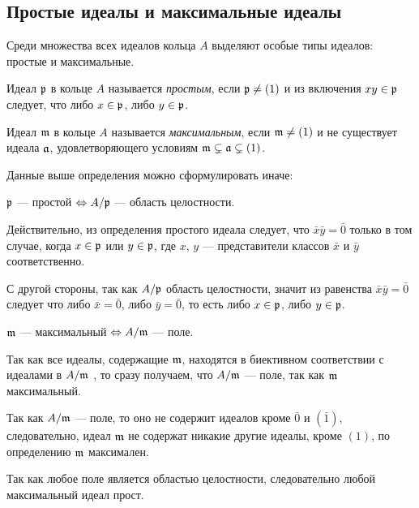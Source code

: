     \subsection{Простые идеалы и максимальные идеалы}
    Среди множества всех идеалов кольца $A$ выделяют особые типы идеалов: простые и максимальные.
    \begin{Def}
        Идеал $\mathfrak{p}$ в кольце $A$ называется \textit{простым}, если $\mathfrak{p} \neq (1)$ и из включения $xy \in \mathfrak{p}$ следует, что либо $x \in \mathfrak{p}$, либо $y \in \mathfrak{p}$.
    \end{Def}
    \begin{Def}
        Идеал $\mathfrak{m}$ в кольце $A$ называется \textit{максимальным}, если $\mathfrak{m} \neq (1)$ и не существует идеала $\mathfrak{a}$, удовлетворяющего условиям $\mathfrak{m} \subsetneq \mathfrak{a} \subsetneq (1)$.
    \end{Def}

    Данные выше определения можно сформулировать иначе:
    \begin{center}
        $\mathfrak{p}$ --- простой $\Leftrightarrow A/\mathfrak{p}$ --- область целостности. 
    \end{center}

    Действительно, из определения простого идеала следует, что $\bar{x}\bar{y} = \bar{0}$ только в том случае,
    когда $x \in \mathfrak{p}$ или $y \in \mathfrak{p}$, где $x$, $y$ --- представители классов $\bar{x}$ и $\bar{y}$ соответственно.

    С другой стороны, так как $A/\mathfrak{p}$ область целостности, значит из равенства $\bar{x}\bar{y} = \bar{0}$ следует что
    либо $\bar{x} = \bar{0}$, либо $\bar{y} = \bar{0}$, то есть либо $x \in \mathfrak{p}$, либо $y \in \mathfrak{p}$.

    \begin{center}
        $\mathfrak{m}$ --- максимальный $\Leftrightarrow A/\mathfrak{m}$ --- поле.
    \end{center}

    Так как все идеалы, содержащие $\mathfrak{m}$, находятся в биективном соответствии с идеалами в $A/\mathfrak{m}$ \cite{A-M}, 
    то сразу получаем, что $A/\mathfrak{m}$ --- поле, так как $\mathfrak{m}$ максимальный. 

    Так как $A/\mathfrak{m}$ --- поле, то оно не содержит идеалов кроме $\bar{0}$ и $(\bar{1})$, следовательно,
    идеал $\mathfrak{m}$ не содержат никакие другие идеалы, кроме $(1)$, по определению $\mathfrak{m}$ максимален.

    Так как любое поле является областью целостности, следовательно любой максимальный идеал прост.

